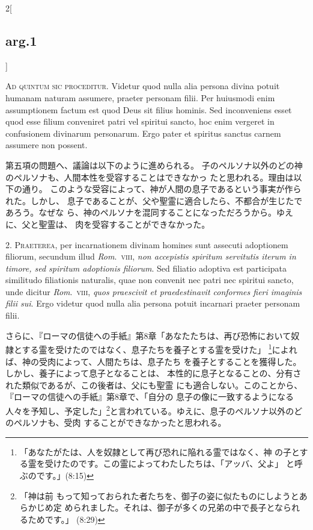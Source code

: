 \documentclass[paper=a4paper,fontsize=10pt,jafontsize=9pt,titlepage]{jlreq}
\begin{document}
\begin{paracol}{2}[\subsection{arg.1}]

{\Huge A}{\scshape d quintum sic proceditur}. Videtur quod nulla alia persona divina potuit
humanam naturam assumere, praeter personam filii. Per huiusmodi enim
assumptionem factum est quod Deus sit filius hominis. Sed inconveniens
esset quod esse filium conveniret patri vel spiritui sancto, hoc enim
vergeret in confusionem divinarum personarum. Ergo pater et spiritus
sanctus carnem assumere non possent.

\switchcolumn

第五項の問題へ、議論は以下のように進められる。
子のペルソナ以外のどの神のペルソナも、人間本性を受容することはできなかっ
 たと思われる。理由は以下の通り。
このような受容によって、神が人間の息子であるという事実が作られた。しかし、
 息子であることが、父や聖霊に適合したら、不都合が生じたであろう。なぜな
 ら、神のペルソナを混同することになっただろうから。ゆえに、父と聖霊は、
 肉を受容することができなかった。


2. {\scshape Praeterea}, per incarnationem divinam homines sunt assecuti adoptionem
filiorum, secundum illud {\itshape Rom}.~{\scshape viii}, {\itshape non accepistis spiritum servitutis
iterum in timore, sed spiritum adoptionis filiorum}. Sed filiatio
adoptiva est participata similitudo filiationis naturalis, quae non
convenit nec patri nec spiritui sancto, unde dicitur {\itshape Rom}.~{\scshape viii}, {\itshape quos
praescivit et praedestinavit conformes fieri imaginis filii sui}. Ergo
videtur quod nulla alia persona potuit incarnari praeter personam filii.

\switchcolumn

さらに、『ローマの信徒への手紙』第8章「あなたたちは、再び恐怖において奴
 隷とする霊を受けたのではなく、息子たちを養子とする霊を受けた」
 \footnote{「あなたがたは、人を奴隷として再び恐れに陥れる霊ではなく、神
 の子とする霊を受けたのです。この霊によってわたしたちは、「アッバ、父よ」
 と呼ぶのです。」(8:15)}によれば、神の受肉によって、人間たちは、息子たち
 を養子とすることを獲得した。しかし、養子によって息子となることは、
 本性的に息子となることの、分有された類似であるが、この後者は、父にも聖霊
 にも適合しない。このことから、『ローマの信徒への手紙』第8章で、「自分の
 息子の像に一致するようになる人々を予知し、予定した」\footnote{「神は前
 もって知っておられた者たちを、御子の姿に似たものにしようとあらかじめ定
 められました。それは、御子が多くの兄弟の中で長子となられるためです。」
 (8:29)}と言われている。ゆえに、息子のペルソナ以外のどのペルソナも、受肉
 することができなかったと思われる。


\end{paracol}
\end{document}
